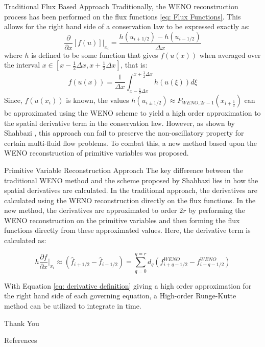 \documentclass[9pt]{beamer}
\begin{document}
\begin{frame}{Traditional Flux Based Approach}
Traditionally, the WENO reconstruction process has been performed on the flux functions \eqref{eq: Flux Functions}.  This allows for the right hand side of a conservation law to be expressed exactly as:
\begin{equation}
\frac{\partial}{\partial	x}[f(u)]\bigg|_{x_i}=\frac{h(u_{i+1/2}) - h(u_{i-1/2})}{\Delta x} \label{eq: Traditional Derivative}
\end{equation}
where $h$ is defined to be some function that gives $f(u(x))$ when averaged over the interval $x\in[x-\frac{1}{2}\Delta x, x+\frac{1}{2}\Delta x]$, that is:
\begin{equation}
f(u(x))=\frac{1}{\Delta x} \int_{x-\frac{1}{2}\Delta x}^{x+\frac{1}{2}\Delta x}h(u(\xi))d\xi
\end{equation}
Since, $f(u(x_i))$ is known, the values $h(u_{i\pm1/2})\approx P_{WENO, 2r-1}(x_{i+\frac{1}{2}})$ can be approximated using the WENO scheme to yield a high order approximation to the spatial derivative term in the conservation law.  However, as shown by Shahbazi \cite{Shahbazi}, this approach can fail to preserve the non-oscillatory property for certain multi-fluid flow problems.  To combat this, a new method based upon the WENO reconstruction of primitive variables was proposed.
\end{frame}


\begin{frame}{Primitive Variable Reconstruction Approach}
The key difference between the traditional WENO method and the scheme proposed by Shahbazi \cite{Shahbazi} lies in how the spatial derivatives are calculated.  In the traditional approach, the derivatives are calculated using the WENO reconstruction directly on the flux functions.   In the new method, the derivatives are approximated to order $2r$ by performing the WENO reconstruction on the primitive variables and then forming the flux functions directly from these approximated values.  Here, the derivative term is calculated as:     

\begin{equation}
h\frac{\partial f}{\partial x}\bigg|_{x_i}\approx (\hat{f}_{i+1/2}-\hat{f}_{i-1/2}) = \sum_{q=0}^{q=r}d_q(f^{WENO}_{i+q-1/2}-f^{WENO}_{i-q-1/2})
\label{eq: derivative definition}
\end{equation}  

With Equation \ref{eq: derivative definition} giving a high order approximation for the right hand side of each governing equation, a High-order Runge-Kutte method can be utilized to integrate in time. 

\end{frame}


\begin{frame}[standout]
  Thank You
\end{frame}

\appendix

\begin{frame}[allowframebreaks]{References}

  
  

\end{frame}
\end{document}
